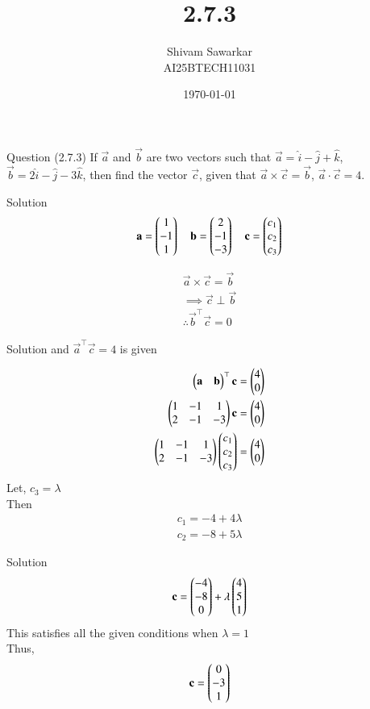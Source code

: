 \documentclass{beamer}
\title %
{2.7.3}
\date{\today}
\author %
{Shivam Sawarkar \\ AI25BTECH11031}
\begin{document}
\frame{\titlepage}
\begin{frame}{Question (2.7.3)}
If $\vec{a}$ and $\vec{b}$ are two vectors such that $\vec{a} = \hat{i} - \hat{j} + \hat{k}$, $\vec{b} = 2\hat{i} - \hat{j} - 3\hat{k}$, then find the vector $\vec{c}$, given that $\vec{a} \times \vec{c} = \vec{b}$, $\vec{a} \cdot \vec{c} = 4$.
\end{frame}

\begin{frame}{Solution}
\begin{align}
\mathbf{a} = \begin{pmatrix}1 \\ -1 \\ 1\end{pmatrix} \quad 
\mathbf{b} = \begin{pmatrix}2 \\ -1 \\ -3\end{pmatrix} \quad 
\mathbf{c} = \begin{pmatrix}c_1 \\ c_2 \\ c_3\end{pmatrix}
\end{align}

\begin{align}
\vec{a}\times\vec{c} = \vec{b} \\ 
\implies \vec{c} \perp \vec{b} \\ 
\therefore \vec{b}^\top\vec{c}=0
\end{align}
\end{frame}

\begin{frame}{Solution}
    and $\vec{a}^\top\vec{c}=4$ is given

\begin{align}
    \begin{pmatrix}\mathbf{a} & \mathbf{b}\end{pmatrix}^\top\mathbf{c}=\begin{pmatrix}4 \\ 0\end{pmatrix} \\ 
    \begin{pmatrix}1 & -1 & 1 \\ 
           2 & -1 & -3\end{pmatrix}\mathbf{c}=\begin{pmatrix}4 \\ 0\end{pmatrix} \\ 
    \begin{pmatrix}1 & -1 & 1 \\ 
    2 & -1 & -3\end{pmatrix}\begin{pmatrix}c_1 \\ c_2 \\ c_3\end{pmatrix}= \begin{pmatrix}4 \\ 0\end{pmatrix}
\end{align}
Let, $c_3=\lambda$ \\
Then 
\begin{align}
c_1=-4+4\lambda \\ 
c_2=-8+5\lambda
\end{align}
\end{frame}

\begin{frame}{Solution}
\begin{align}
    \mathbf{c}=\begin{pmatrix}-4 \\ -8 \\ 0\end{pmatrix}+\lambda\begin{pmatrix}4 \\ 5 \\ 1\end{pmatrix}
\end{align}
This satisfies all the given conditions when $\lambda=1$ \\ Thus,
\begin{align}
    \mathbf{c}=\begin{pmatrix}0 \\ -3 \\ 1\end{pmatrix}
\end{align}
\end{frame}
\end{document}
